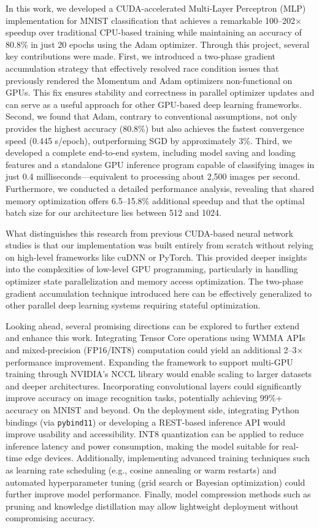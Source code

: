 \documentclass[conference]{IEEEtran}
\begin{document}
In this work, we developed a CUDA-accelerated Multi-Layer Perceptron (MLP) implementation for MNIST classification that achieves a remarkable 100–202× speedup over traditional CPU-based training while maintaining an accuracy of 80.8\% in just 20 epochs using the Adam optimizer. Through this project, several key contributions were made. First, we introduced a two-phase gradient accumulation strategy that effectively resolved race condition issues that previously rendered the Momentum and Adam optimizers non-functional on GPUs. This fix ensures stability and correctness in parallel optimizer updates and can serve as a useful approach for other GPU-based deep learning frameworks. Second, we found that Adam, contrary to conventional assumptions, not only provides the highest accuracy (80.8\%) but also achieves the fastest convergence speed (0.445 s/epoch), outperforming SGD by approximately 3\%. Third, we developed a complete end-to-end system, including model saving and loading features and a standalone GPU inference program capable of classifying images in just 0.4 milliseconds—equivalent to processing about 2,500 images per second. Furthermore, we conducted a detailed performance analysis, revealing that shared memory optimization offers 6.5–15.8\% additional speedup and that the optimal batch size for our architecture lies between 512 and 1024.

What distinguishes this research from previous CUDA-based neural network studies is that our implementation was built entirely from scratch without relying on high-level frameworks like cuDNN or PyTorch. This provided deeper insights into the complexities of low-level GPU programming, particularly in handling optimizer state parallelization and memory access optimization. The two-phase gradient accumulation technique introduced here can be effectively generalized to other parallel deep learning systems requiring stateful optimization.

Looking ahead, several promising directions can be explored to further extend and enhance this work. Integrating Tensor Core operations using WMMA APIs and mixed-precision (FP16/INT8) computation could yield an additional 2–3× performance improvement. Expanding the framework to support multi-GPU training through NVIDIA’s NCCL library would enable scaling to larger datasets and deeper architectures. Incorporating convolutional layers could significantly improve accuracy on image recognition tasks, potentially achieving 99\%+ accuracy on MNIST and beyond. On the deployment side, integrating Python bindings (via \texttt{pybind11}) or developing a REST-based inference API would improve usability and accessibility. INT8 quantization can be applied to reduce inference latency and power consumption, making the model suitable for real-time edge devices. Additionally, implementing advanced training techniques such as learning rate scheduling (e.g., cosine annealing or warm restarts) and automated hyperparameter tuning (grid search or Bayesian optimization) could further improve model performance. Finally, model compression methods such as pruning and knowledge distillation may allow lightweight deployment without compromising accuracy.
\end{document}
